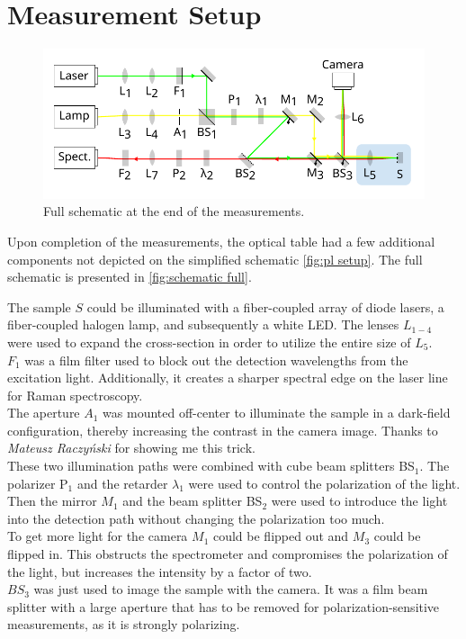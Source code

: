 \documentclass[
	twoside,
	parskip=half,
	a4paper,
]{scrbook}
\begin{document}
\section{Measurement Setup}
\begin{figure}
	\centering
	\includegraphics{../figures/setup.pdf}
	\caption{Full schematic at the end of the measurements.}
	\label{fig:schematic full}
\end{figure}
Upon completion of the measurements, the optical table had a few additional components not depicted on the simplified schematic \autoref{fig:pl setup}.
The full schematic is presented in \autoref{fig:schematic full}.

The sample $S$ could be illuminated with a fiber-coupled array of diode lasers, a fiber-coupled halogen lamp, and subsequently a white LED.
The lenses $L_{1-4}$ were used to expand the cross-section in order to utilize the entire size of $L_5$. \\
$F_1$ was a film filter used to block out the detection wavelengths from the excitation light.
Additionally, it creates a sharper spectral edge on the laser line for Raman spectroscopy.\\
The aperture $A_1$ was mounted off-center to illuminate the sample in a dark-field configuration, thereby increasing the contrast in the camera image.
Thanks to \textit{Mateusz Raczyński} for showing me this trick.\\
These two illumination paths were combined with cube beam splitters BS$_1$.
The polarizer P$_1$ and the retarder $\lambda_1$ were used to control the polarization of the light.\\
Then the mirror $M_1$ and the beam splitter BS$_2$ were used to introduce the light into the detection path without changing the polarization too much.\\
To get more light for the camera $M_1$ could be flipped out and $M_3$ could be flipped in.
This obstructs the spectrometer and compromises the polarization of the light, but increases the intensity by a factor of two.\\
$BS_3$ was just used to image the sample with the camera. 
It was a film beam splitter with a large aperture that has to be removed for polarization-sensitive measurements, as it is strongly polarizing.
\end{document}
